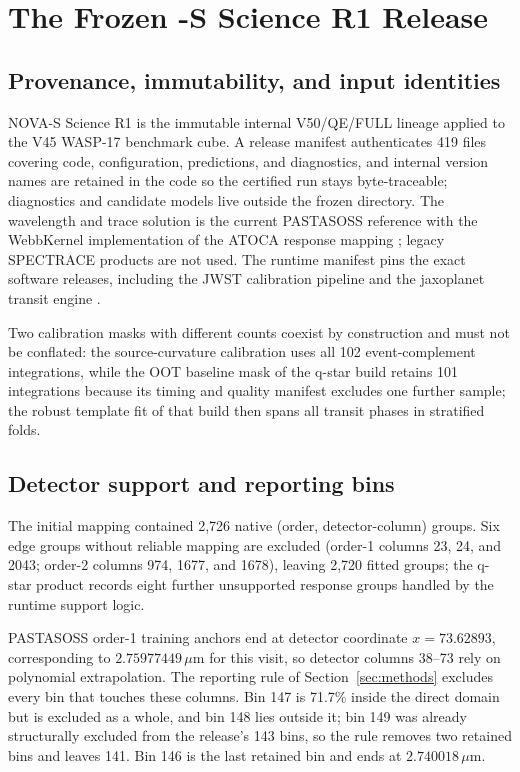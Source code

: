 \section{The Frozen \nova{}-S Science R1 Release}
\label{app:nova}

\subsection{Provenance, immutability, and input identities}

NOVA-S Science R1 is the immutable internal V50/QE/FULL lineage applied to
the V45 WASP-17 benchmark cube. A release manifest authenticates 419 files
covering code, configuration, predictions, and diagnostics, and internal
version names are retained in the code so the certified run stays
byte-traceable; diagnostics and candidate models live outside the frozen
directory. The wavelength and trace solution is the current PASTASOSS
reference \citep{BainesEtAl2023Trace,BainesEtAl2023Wavelength} with the
WebbKernel implementation of the ATOCA response mapping
\citep{DarveauBernierEtAl2022,JWSTPipeline2025}; legacy SPECTRACE products
are not used. The runtime manifest pins the exact software releases,
including the JWST calibration pipeline \citep{JWSTPipeline2025} and the
jaxoplanet transit engine \citep{Jaxoplanet2025}.

Two calibration masks with different counts coexist by construction and
must not be conflated: the source-curvature calibration uses all 102
event-complement integrations, while the OOT baseline mask of the q-star build
retains 101 integrations because its timing and quality manifest excludes
one further sample; the robust template fit of that build then spans all
transit phases in stratified folds.

\subsection{Detector support and reporting bins}

The initial mapping contained 2{,}726 native (order, detector-column)
groups. Six edge groups without reliable mapping are excluded
(order-1 columns 23, 24, and 2043; order-2 columns 974, 1677, and 1678),
leaving 2{,}720 fitted groups; the q-star product records eight further
unsupported response groups handled by the runtime support logic.

PASTASOSS order-1 training anchors end at detector coordinate
$x=73.62893$, corresponding to $2.75977449\,\mu\mathrm{m}$ for this visit,
so detector columns 38--73 rely on polynomial extrapolation. The reporting
rule of Section~\ref{sec:methods} excludes every bin that touches these
columns. Bin 147 is 71.7\% inside the direct domain but is excluded as a
whole, and bin 148 lies outside it; bin 149 was already structurally
excluded from the release's 143 bins, so the rule removes two retained
bins and leaves 141. Bin 146 is the last retained bin and ends at
$2.740018\,\mu\mathrm{m}$.

